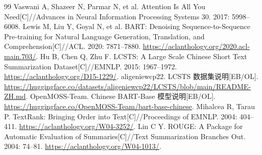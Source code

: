 \documentclass{sdxxpaper}
\begin{document}
\begin{thebibliography}{99}
 Vaswani A, Shazeer N, Parmar N, et al. Attention Is All You Need[C]//Advances in Neural Information Processing Systems 30. 2017: 5998--6008.
 Lewis M, Liu Y, Goyal N, et al. BART: Denoising Sequence-to-Sequence Pre-training for Natural Language Generation, Translation, and Comprehension[C]//ACL. 2020: 7871--7880. \url{https://aclanthology.org/2020.acl-main.703/}.
 Hu B, Chen Q, Zhu F. LCSTS: A Large Scale Chinese Short Text Summarization Dataset[C]//EMNLP. 2015: 1967--1972. \url{https://aclanthology.org/D15-1229/}.
 aligeniewcp22. LCSTS 数据集说明[EB/OL]. \url{https://huggingface.co/datasets/aligeniewcp22/LCSTS/blob/main/README-ZH.md}.
 OpenMOSS-Team. Chinese BART-Base 模型说明[EB/OL]. \url{https://huggingface.co/OpenMOSS-Team/bart-base-chinese}.
 Mihalcea R, Tarau P. TextRank: Bringing Order into Text[C]//Proceedings of EMNLP. 2004: 404--411. \url{https://aclanthology.org/W04-3252/}.
 Lin C Y. ROUGE: A Package for Automatic Evaluation of Summaries[C]//Text Summarization Branches Out. 2004: 74--81. \url{https://aclanthology.org/W04-1013/}.
\end{thebibliography}
\end{document}
